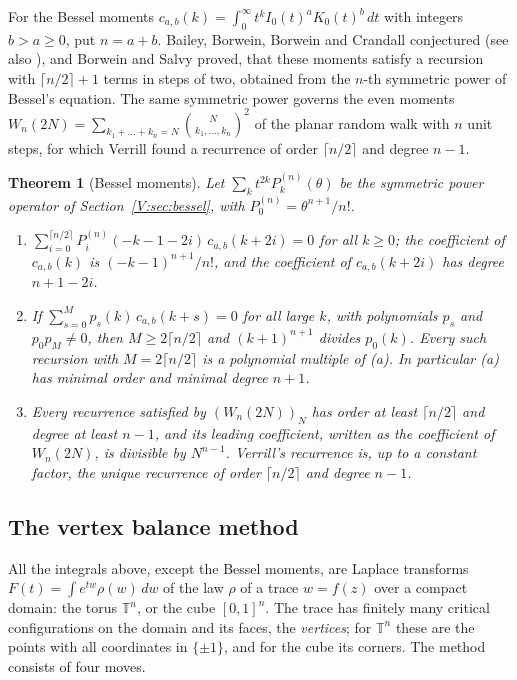 \documentclass[11pt,a4paper]{article}
\newtheorem{theorem}{Theorem}[section]
\theoremstyle{definition}
\theoremstyle{remark}
\newcommand{\T}{\mathbb T}
\newcommand{\cl}[1]{\lceil #1\rceil}
\numberwithin{equation}{section}
\begin{document}
For the Bessel moments $c_{a,b}(k)=\int_0^\infty t^kI_0(t)^aK_0(t)^b\,dt$ with integers $b>a\ge0$, put $n=a+b$. Bailey, Borwein, Borwein and Crandall conjectured \cite[Conj.~1]{BBBC07} (see also \cite{BBC06,BBBG08}), and Borwein and Salvy \cite{BS08} proved, that these moments satisfy a recursion with $\cl{n/2}+1$ terms in steps of two, obtained from the $n$-th symmetric power of Bessel's equation. The same symmetric power governs the even moments $W_n(2N)=\sum_{k_1+\dots+k_n=N}\binom{N}{k_1,\dots,k_n}^2$ of the planar random walk with $n$ unit steps, for which Verrill \cite{Ver04} found a recurrence of order $\cl{n/2}$ and degree $n-1$.

\begin{theorem}[Bessel moments]\label{V:thm:F}
Let $\sum_{k}t^{2k}P^{(n)}_k(\theta)$ be the symmetric power operator of Section~\ref{V:sec:bessel}, with $P^{(n)}_0=\theta^{n+1}/n!$.
\begin{enumerate}
\item[(a)] $\sum_{i=0}^{\cl{n/2}}P^{(n)}_i(-k-1-2i)\,c_{a,b}(k+2i)=0$ for all $k\ge0$; the coefficient of $c_{a,b}(k)$ is $(-k-1)^{n+1}/n!$, and the coefficient of $c_{a,b}(k+2i)$ has degree $n+1-2i$.
\item[(b)] If $\sum_{s=0}^{M}p_s(k)\,c_{a,b}(k+s)=0$ for all large $k$, with polynomials $p_s$ and $p_0p_M\ne0$, then $M\ge2\cl{n/2}$ and $(k+1)^{n+1}$ divides $p_0(k)$. Every such recursion with $M=2\cl{n/2}$ is a polynomial multiple of (a). In particular (a) has minimal order and minimal degree $n+1$.
\item[(c)] Every recurrence satisfied by $(W_n(2N))_N$ has order at least $\cl{n/2}$ and degree at least $n-1$, and its leading coefficient, written as the coefficient of $W_n(2N)$, is divisible by $N^{n-1}$. Verrill's recurrence is, up to a constant factor, the unique recurrence of order $\cl{n/2}$ and degree $n-1$.
\end{enumerate}
\end{theorem}

\subsection{The vertex balance method}\label{V:ssec:method}
All the integrals above, except the Bessel moments, are Laplace transforms $F(t)=\int e^{tw}\rho(w)\,dw$ of the law $\rho$ of a trace $w=f(z)$ over a compact domain: the torus $\T^n$, or the cube $[0,1]^n$. The trace has finitely many critical configurations on the domain and its faces, the \emph{vertices}; for $\T^n$ these are the points with all coordinates in $\{\pm1\}$, and for the cube its corners. The method consists of four moves.
\end{document}
